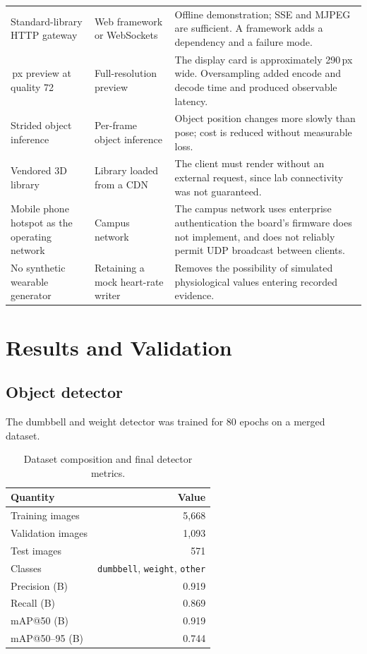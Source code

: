 \documentclass[11pt,a4paper]{article}
\newcommand{\code}[1]{\texttt{\small #1}}
\begin{document}
\begin{xltabular}{\textwidth}{@{}L{3.9cm} L{4.6cm} Y@{}}
\addlinespace
Standard-library HTTP gateway &
Web framework or WebSockets &
Offline demonstration; SSE and MJPEG are sufficient. A framework adds a dependency and a failure mode. \\
\,px preview at quality 72 &
Full-resolution preview &
The display card is approximately 290\,px wide. Oversampling added encode and decode time and produced observable latency. \\
\addlinespace
Strided object inference &
Per-frame object inference &
Object position changes more slowly than pose; cost is reduced without measurable loss. \\
\addlinespace
Vendored 3D library &
Library loaded from a CDN &
The client must render without an external request, since lab connectivity was not guaranteed. \\
\addlinespace
Mobile phone hotspot as the operating network &
Campus network &
The campus network uses enterprise authentication the board's firmware does not implement, and does not reliably permit UDP broadcast between clients. \\
\addlinespace
No synthetic wearable generator &
Retaining a mock heart-rate writer &
Removes the possibility of simulated physiological values entering recorded evidence. \\
\end{xltabular}

\section{Results and Validation}
\label{sec:results}

\subsection{Object detector}

The dumbbell and weight detector was trained for 80 epochs on a merged dataset.

\begin{table}[H]
\centering
\small
\caption{Dataset composition and final detector metrics.}
\begin{tabular}{@{}lr@{}}
\toprule
\textbf{Quantity} & \textbf{Value} \\
\midrule
Training images & 5{,}668 \\
Validation images & 1{,}093 \\
Test images & 571 \\
Classes & \code{dumbbell}, \code{weight}, \code{other} \\
\midrule
Precision (B) & 0.919 \\
Recall (B) & 0.869 \\
mAP@50 (B) & 0.919 \\
mAP@50--95 (B) & 0.744 \\
\bottomrule
\end{tabular}
\end{table}
\end{document}
